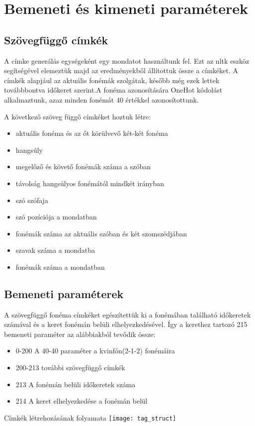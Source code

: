 \section{Bemeneti és kimeneti paraméterek}
\subsection{Szövegfüggő címkék}
A címke generálás egységeként egy mondatot használtunk fel. Ezt az nltk eszköz segítségével elemeztük majd az eredményekből állítottuk össze a címkéket. A címkék alapjául az aktuális fonémák szolgátak, később még ezek lettek továbbbontva időkeret szerint.A fonéma azonosítására OneHot kódolást alkalmaztunk, azaz minden fonémát 40 értékkel azonosítottunk.

A következő szöveg függő címkéket hoztuk létre:

\begin{itemize}
	\item aktuális fonéma és az őt körülvevő két-két fonéma
	\item hangsúly
	\item megelőző és követő fonémák száma a szóban 
	\item távolság hangsúlyos fonémától mindkét irányban
	\item szó szófaja
	\item szó pozíciója a mondatban
	\item fonémák száma az aktuális szóban és két szomszédjában
	\item szavak száma a mondatba
	\item fonémák száma a mondatban
\end{itemize}

\subsection{Bemeneti paraméterek}
A szövegfüggő fonéma címkéket egészítettük ki a fonémában található időkeretek számával és a keret fonémán belüli elhelyezkedésével. Így a kerethez tartozó 215 bemeneti paraméter az alábbiakból tevődik össze:


\begin{minipage}{0.5\textwidth}
	\begin{itemize}
		\item 0-200 A 40-40 paraméter a kvinfón(2-1-2) fonémáira
		\item 200-213 további szövegfüggő címkék
		\item 213 A fonémán belüli időkeretek száma
		\item 214 A keret elhelyezkedése a fonémán belül
	\end{itemize} 
\end{minipage} \hfill
\begin{minipage}{0.5\textwidth}
	\centering
	Címkék létrehozásának folyamata
	\texttt{[image: tag\_struct]}
\end{minipage} \hfill
